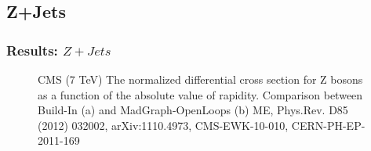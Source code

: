 \documentclass{beamer}
\numberwithin{figure}{section}
\begin{document}
\subsection{Z+Jets}
\begin{frame}
 \frametitle{Results: $Z+Jets$} 

\begin{figure}[!tbp]
  \centering
  \hfill
  \caption{\scriptsize{CMS (7 TeV) The normalized differential cross section for Z bosons as a function of the absolute value of rapidity. Comparison between Build-In (a) and MadGraph-OpenLoops (b) ME,  Phys.Rev. D85 (2012) 032002, arXiv:1110.4973, CMS-EWK-10-010, CERN-PH-EP-2011-169}}
\end{figure}
 

\end{frame}

\end{document}
